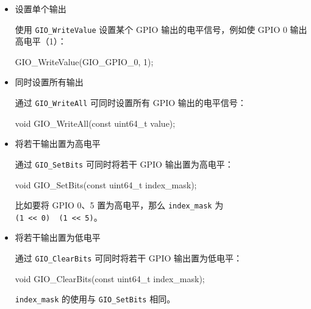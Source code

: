 \documentclass[
  12pt,
]{book}
\newenvironment{Shaded}{\begin{snugshade}}{\end{snugshade}}
\newcommand{\DataTypeTok}[1]{\textcolor[rgb]{0.13,0.29,0.53}{#1}}
\newcommand{\DecValTok}[1]{\textcolor[rgb]{0.00,0.00,0.81}{#1}}
\newcommand{\NormalTok}[1]{#1}
\begin{document}
\begin{itemize}
\item
  设置单个输出

  使用 \texttt{GIO\_WriteValue} 设置某个 GPIO 输出的电平信号，例如使 GPIO 0 输出高电平（1）：

\begin{Shaded}
\begin{Highlighting}[]
\NormalTok{GIO_WriteValue(GIO_GPIO_0, }\DecValTok{1}\NormalTok{);}
\end{Highlighting}
\end{Shaded}
\item
  同时设置所有输出

  通过 \texttt{GIO\_WriteAll} 可同时设置所有 GPIO 输出的电平信号：

\begin{Shaded}
\begin{Highlighting}[]
\DataTypeTok{void}\NormalTok{ GIO_WriteAll(}\DataTypeTok{const} \DataTypeTok{uint64_t}\NormalTok{ value);}
\end{Highlighting}
\end{Shaded}
\item
  将若干输出置为高电平

  通过 \texttt{GIO\_SetBits} 可同时将若干 GPIO 输出置为高电平：

\begin{Shaded}
\begin{Highlighting}[]
\DataTypeTok{void}\NormalTok{ GIO_SetBits(}\DataTypeTok{const} \DataTypeTok{uint64_t}\NormalTok{ index_mask);}
\end{Highlighting}
\end{Shaded}

  比如要将 GPIO 0、5 置为高电平，那么 \texttt{index\_mask} 为 \texttt{(1\ \textless{}\textless{}\ 0)\ \textbar{}\ (1\ \textless{}\textless{}\ 5)}。
\item
  将若干输出置为低电平

  通过 \texttt{GIO\_ClearBits} 可同时将若干 GPIO 输出置为低电平：

\begin{Shaded}
\begin{Highlighting}[]
\DataTypeTok{void}\NormalTok{ GIO_ClearBits(}\DataTypeTok{const} \DataTypeTok{uint64_t}\NormalTok{ index_mask);}
\end{Highlighting}
\end{Shaded}

  \texttt{index\_mask} 的使用与 \texttt{GIO\_SetBits} 相同。
\end{itemize}
\end{document}
